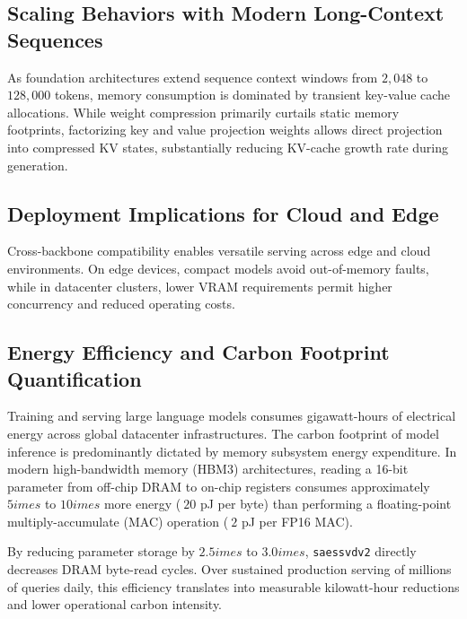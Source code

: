 \subsection{Scaling Behaviors with Modern Long-Context Sequences}
As foundation architectures extend sequence context windows from $2{,}048$ to $128{,}000$ tokens, memory consumption is dominated by transient key-value cache allocations. While weight compression primarily curtails static memory footprints, factorizing key and value projection weights allows direct projection into compressed KV states, substantially reducing KV-cache growth rate during generation.

\subsection{Deployment Implications for Cloud and Edge}
Cross-backbone compatibility enables versatile serving across edge and cloud environments. On edge devices, compact models avoid out-of-memory faults, while in datacenter clusters, lower VRAM requirements permit higher concurrency and reduced operating costs.

\subsection{Energy Efficiency and Carbon Footprint Quantification}
Training and serving large language models consumes gigawatt-hours of electrical energy across global datacenter infrastructures. The carbon footprint of model inference is predominantly dictated by memory subsystem energy expenditure. In modern high-bandwidth memory (HBM3) architectures, reading a 16-bit parameter from off-chip DRAM to on-chip registers consumes approximately $5	imes$ to $10	imes$ more energy ($~20$ pJ per byte) than performing a floating-point multiply-accumulate (MAC) operation ($~2$ pJ per FP16 MAC).

By reducing parameter storage by $2.5	imes$ to $3.0	imes$, \texttt{saessvdv2} directly decreases DRAM byte-read cycles. Over sustained production serving of millions of queries daily, this efficiency translates into measurable kilowatt-hour reductions and lower operational carbon intensity.
